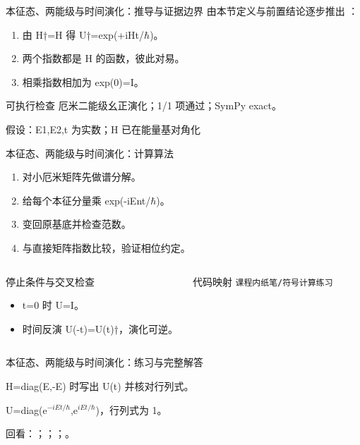 \begin{frame}[t]{本征态、两能级与时间演化：推导与证据边界}
\footnotesize
{}\quad 由本节定义与前置结论逐步推出 ：
\begin{enumerate}
\item 由 H†=H 得 U†=exp(+iHt/\allowbreak{}\ensuremath{\hbar})。
\item 两个指数都是 H 的函数，彼此对易。
\item 相乘指数相加为 exp(0)=I。
\end{enumerate}\begin{block}{可执行检查}
\quad 厄米二能级幺正演化；1/1 项通过；SymPy exact。
\par\scriptsize 假设：E1,E2,t 为实数；H 已在能量基对角化
\end{block}
\end{frame}

\begin{frame}[t]{本征态、两能级与时间演化：计算算法}
\footnotesize
{}\begin{enumerate}
\item 对小厄米矩阵先做谱分解。
\item 给每个本征分量乘 exp(-iEnt/\allowbreak{}\ensuremath{\hbar})。
\item 变回原基底并检查范数。
\item 与直接矩阵指数比较，验证相位约定。
\end{enumerate}\begin{columns}[T,onlytextwidth]
\begin{block}{停止条件与交叉检查}\scriptsize\begin{itemize}
\item[\CheckMark] t=0 时 U=I。
\item[\CheckMark] 时间反演 U(-t)=U(t)†，演化可逆。
\end{itemize}\end{block}
\begin{block}{代码映射}
\scriptsize \texttt{课程内纸笔/\allowbreak{}符号计算练习}
\end{block}\end{columns}\end{frame}

\begin{frame}[t]{本征态、两能级与时间演化：练习与完整解答}
\footnotesize
\begin{block}{}H=diag(E,-E) 时写出 U(t) 并核对行列式。\end{block}
\begin{exampleblock}{}U=diag(e\ensuremath{^{-iEt/\hbar}},e\ensuremath{^{iEt/\hbar}})，行列式为 1。\end{exampleblock}
\vfill
\scriptsize 回看：；；；。
\end{frame}

